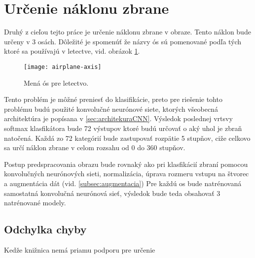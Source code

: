 
\section{Určenie náklonu zbrane}
Druhý z cieľou tejto práce je určenie náklonu zbrane v obraze.
Tento náklon bude určeny v 3 osách.
Dôležité je spomenúť že názvy ós sú pomenované podľa tých ktoré sa používajú v letectve, vid. obrázok \ref{pic:airplaneaxis}.
\begin{figure}[H]
    \centering
    \texttt{[image: airplane-axis]}
    \caption{Mená ós pre letectvo.}
    \label{pic:airplaneaxis}
\end{figure}

Tento problém je môžné preniesť do klasifikácie, preto pre riešenie tohto problému budú použité konvolučné neurónové siete, ktorých všeobecná architektúra je popísana v \ref{sec:architekuraCNN}.
Výsledok poslednej vrtsvy softmax klasfikátora bude 72 výstupov ktoré budú určovať o aký uhol je zbraň natočená.
Každá zo 72 kategórií bude zastupovať rozpätie 5 stupňov, ciže celkovo sa určí náklon zbrane v celom rozsahu od 0 do 360 stupňov.

Postup predspracovania obrazu bude rovnaký ako pri klasfikácií zbraní pomocou konvolučných neurónových sieti, normalizácia, úprava rozmeru vstupu na štvorec a augmentácia dát (vid. \ref{subsec:augmentacia})
Pre každú os bude natrénovaná samostatná konvolučná neurónová sieť, výsledok bude teda obsahovať 3 natrénované modely.


\subsection{Odchylka chyby}
Kedže knižnica nemá priamu podporu pre určenie
